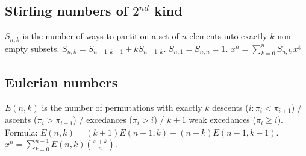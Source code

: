 \documentclass[12pt]{extarticle}
\begin{document}
\begin{multicols*}{2}
\subsection{Stirling numbers of $2^{nd}$ kind}
$S_{n,k}$ is the number of ways to partition a set of $n$ elements into
exactly $k$ non-empty subsets.
$S_{n,k} = S_{n-1,k-1} + k S_{n-1,k}$.
$S_{n,1} = S_{n,n} = 1$.
$x^n = \sum_{k=0}^n S_{n,k}\,x^{\underline k}$




\subsection{Eulerian numbers}
$E(n,k)$ is the number of permutations with exactly
$k$ descents ($i: \pi_i < \pi_{i+1}$) /
ascents ($\pi_i > \pi_{i+1}$) /
excedances ($\pi_i > i$) /
$k+1$ weak excedances ($\pi_i \ge i$). \\
Formula: $E(n,k)=(k+1)E(n-1,k)+(n-k)E(n-1,k-1)$. \quad
$x^n = \sum_{k=0}^{n-1} E(n,k) {x+k \choose n}$.


\end{multicols*}
\end{document}
